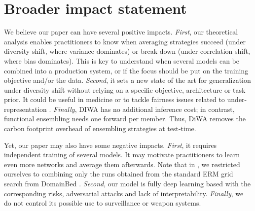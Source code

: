 \section{Broader impact statement}
\label{app:broader_impact}

We believe our paper can have several positive impacts.
\textit{First}, our theoretical analysis enables practitioners to know when averaging strategies succeed (under diversity shift, where variance dominates) or break down (under correlation shift, where bias dominates).
This is key to understand when several models can be combined into a production system, or if the focus should be put on the training objective and/or the data.
\textit{Second}, it sets a new state of the art for \ood generalization under diversity shift without relying on a specific objective, architecture or task prior. It could be useful in medicine \cite{Zech2018,degrave2021ai} or to tackle fairness issues related to under-representation \cite{Sagawa2020Distributionally,blodgett2016demographic,barocas2016big}.
\textit{Finally}, DIWA has no additional inference cost; in contrast, functional ensembling needs one forward per member.
Thus, DiWA removes the carbon footprint overhead of ensembling strategies at test-time.

Yet, our paper may also have some negative impacts.
\textit{First}, it requires independent training of several models. It may motivate practitioners to learn even more networks and average them afterwards.
Note that in , we restricted ourselves to combining only the runs obtained from the standard ERM grid search from DomainBed \cite{gulrajani2021in}.
\textit{Second}, our model is fully deep learning based with the corresponding risks, \eg adversarial attacks and lack of interpretability.
\textit{Finally}, we do not control its possible use to surveillance or weapon systems.
